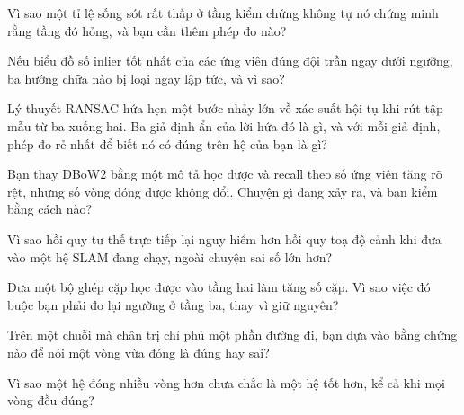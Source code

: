 \documentclass[../../deep_learning.tex]{subfiles}
\begin{document}
\begin{tukiem}
\item Vì sao một tỉ lệ sống sót rất thấp ở tầng kiểm chứng không tự nó chứng minh rằng tầng đó hỏng, và bạn cần thêm phép đo nào?
\item Nếu biểu đồ số inlier tốt nhất của các ứng viên đúng đội trần ngay dưới ngưỡng, ba hướng chữa nào bị loại ngay lập tức, và vì sao?
\item Lý thuyết RANSAC hứa hẹn một bước nhảy lớn về xác suất hội tụ khi rút tập mẫu từ ba xuống hai. Ba giả định ẩn của lời hứa đó là gì, và với mỗi giả định, phép đo rẻ nhất để biết nó có đúng trên hệ của bạn là gì?
\item Bạn thay DBoW2 bằng một mô tả học được và recall theo số ứng viên tăng rõ rệt, nhưng số vòng đóng được không đổi. Chuyện gì đang xảy ra, và bạn kiểm bằng cách nào?
\item Vì sao hồi quy tư thế trực tiếp lại nguy hiểm hơn hồi quy toạ độ cảnh khi đưa vào một hệ SLAM đang chạy, ngoài chuyện sai số lớn hơn?
\item Đưa một bộ ghép cặp học được vào tầng hai làm tăng số cặp. Vì sao việc đó buộc bạn phải đo lại ngưỡng ở tầng ba, thay vì giữ nguyên?
\item Trên một chuỗi mà chân trị chỉ phủ một phần đường đi, bạn dựa vào bằng chứng nào để nói một vòng vừa đóng là đúng hay sai?
\item Vì sao một hệ đóng nhiều vòng hơn chưa chắc là một hệ tốt hơn, kể cả khi mọi vòng đều đúng?
\end{tukiem}
\ifSubfilesClassLoaded{\printbibliography[title={Nguồn}]}{}
\end{document}
